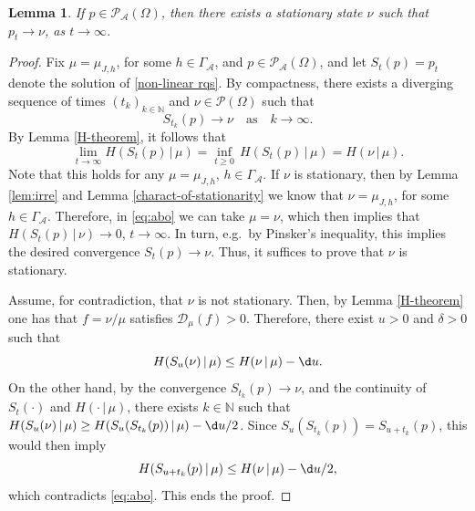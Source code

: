 \documentclass[11pt,reqno]{amsart}
\numberwithin{equation}{section}
\numberwithin{figure}{section}
\newtheorem{lemma}[theorem]{Lemma}
\newcommand{\1}{\mathds{1}}
\newcommand{\tc}{\,|\,}
\let\O=\Omega
\let\G=\Gamma
\newcommand{\cA}{\ensuremath{\mathcal A}}
\newcommand{\cD}{\ensuremath{\mathcal D}}
\newcommand{\cP}{\ensuremath{\mathcal P}}
\newcommand{\bbN}{{\ensuremath{\mathbb N}} }
\begin{document}
\begin{lemma}
If $p\in\cP_\cA(\O)$, then there exists a stationary state $\nu$ such that $p_t \to \nu$, as $t\to\infty$.
\end{lemma}
\begin{proof}
Fix $\mu=\mu_{J,h}$, for some $h\in\G_\cA$, and $p\in\cP_\cA(\O)$, and let $S_t(p)=p_t$ denote the solution of \eqref{non-linear rqs}.
By compactness, there exists a diverging sequence of times \((t_k)_{k \in \mathbb{N}}\) and \(\nu \in \mathcal{P}(\Omega)\) such that
\[
S_{t_k}(p) \to \nu \quad \text{as} \quad k \to \infty.
\]
By Lemma \ref{H-theorem}, it follows that
\begin{equation} \label{eq:abo}
\lim_{t \to \infty} H(S_t(p)\tc \mu) = \inf_{t \ge 0} \,H(S_t(p) \tc \mu) = H(\nu \tc \mu).
\end{equation}
Note that this holds for any $\mu=\mu_{J,h}$, $h\in\G_\cA$. If $\nu$ is stationary, then by Lemma \ref{lem:irre} and Lemma \ref{charact-of-stationarity} we know that $\nu=\mu_{J,h}$, for some $h\in\G_\cA$. Therefore, in \eqref{eq:abo} we can take $\mu=\nu$, which then implies that $H(S_t(p)\tc \nu) \to 0$, $t\to\infty$. In turn, e.g.\ by Pinsker's inequality, this implies the desired convergence $ S_t(p)\to \nu$. Thus, it suffices to prove that $\nu$ is stationary. 
 

Assume, for contradiction, that \(\nu\) is not stationary. Then, by Lemma \ref{H-theorem} one has that $f=\nu/\mu$ satisfies $\cD_\mu(f)>0$.
Therefore, 
there exist \(u > 0\) and \(\delta > 0\) such that
\[
H(S_u(\nu) \tc \mu) \le H(\nu \tc \mu) - \d u .
\]
On the other hand, by the convergence $S_{t_k}(p) \to \nu$, and the continuity of $S_t(\cdot)$ and $H(\cdot\tc\mu)$, there exists $k\in\bbN$ such that $H(S_u(\nu) \tc \mu)\ge H(S_u(S_{t_k}(p)) \tc \mu) - \d u /2$.
Since $S_u(S_{t_k}(p))=S_{u+t_k}(p)$, this would then imply
\[
H(S_{u+t_k}(p) \tc \mu) \le H(\nu \tc \mu) - \d u/2 ,
\]
which contradicts \eqref{eq:abo}. This ends the proof. 
\end{proof}
\end{document}

